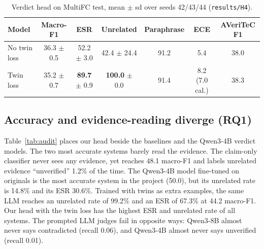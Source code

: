 \documentclass[11pt,a4paper]{article}
\begin{document}
\begin{table}[t]
\centering\small
\caption{Verdict head on MultiFC test, mean $\pm$ sd over seeds 42/43/44 (\texttt{results/H4}).}
\label{tab:twinloss}
\begin{tabular}{@{}lcccccc@{}}
\toprule
Model & Macro-F1 & ESR & Unrelated & Paraphrase & ECE & AVeriTeC F1 \\
\midrule
No twin loss & 36.3 $\pm$ 0.5 & 52.2 $\pm$ 3.0 & 42.4 $\pm$ 24.4 & 91.2 & 5.4 & 38.0 \\
Twin loss & 35.2 $\pm$ 0.7 & \textbf{89.7} $\pm$ 0.9 & \textbf{100.0} $\pm$ 0.0 & 91.4 & 8.2 (7.0 cal.) & 38.3 \\
\bottomrule
\end{tabular}
\end{table}

\subsection{Accuracy and evidence-reading diverge (RQ1)}
Table~\ref{tab:audit} places our head beside the baselines and the Qwen3-4B verdict models. The two most accurate systems barely read the evidence. The claim-only classifier never sees any evidence, yet reaches 48.1 macro-F1 and labels unrelated evidence ``unverified'' 1.2\% of the time. The Qwen3-4B model fine-tuned on originals is the most accurate system in the project (50.0), but its unrelated rate is 14.8\% and its ESR 30.6\%. Trained with twins as extra examples, the same LLM reaches an unrelated rate of 99.2\% and an ESR of 67.3\% at 44.2 macro-F1. Our head with the twin loss has the highest ESR and unrelated rate of all systems. The prompted LLM judges fail in opposite ways: Qwen3-8B almost never says contradicted (recall 0.06), and Qwen3-4B almost never says unverified (recall 0.01).
\end{document}
